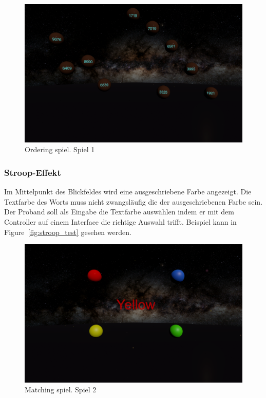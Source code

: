 \begin{figure}
	\includegraphics[width=\textwidth]{./images/ordering.png}
	\caption{Ordering spiel. Spiel 1}
	\label{fig:ordeing}
\end{figure}

\subsubsection{Stroop-Effekt} 
Im Mittelpunkt des Blickfeldes wird eine ausgeschriebene Farbe angezeigt. Die Textfarbe des Worts muss nicht zwangsläufig die der ausgeschriebenen Farbe sein. Der Proband soll als Eingabe die Textfarbe auswählen indem er mit dem Controller auf einem Interface die richtige Auswahl trifft. Beispiel kann in Figure~\ref{fig:stroop_test} gesehen werden.

\begin{figure}
	\includegraphics[width=\textwidth]{./images/matching.png}
	\caption{Matching spiel. Spiel 2}
	\label{fig:matching}
\end{figure}

